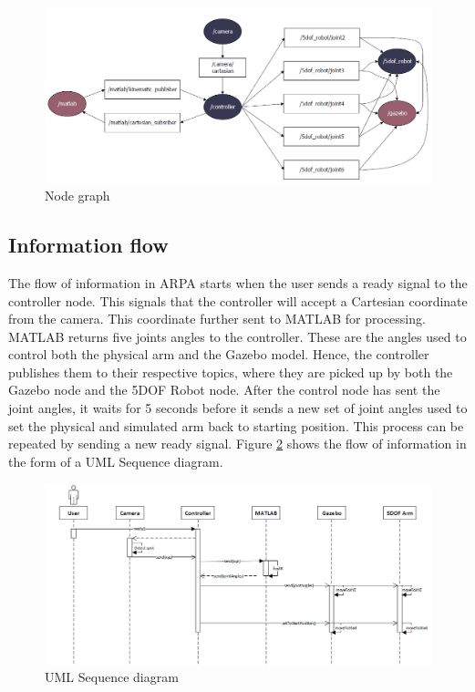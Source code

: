 \documentclass[11pt,a4paper]{report}
\begin{document}
	\begin{figure}[H]
		\includegraphics[width=\linewidth]{../Diagrams/NodeGraph-v1.png}
		\caption{Node graph}
		\label{fig:nodegraph}
	\end{figure}
	
	
	
	\subsection{Information flow}
	
	The flow of information in ARPA starts when the user sends a ready signal to the controller node. This signals that the controller will accept a Cartesian coordinate from the camera. This coordinate  further sent to MATLAB for processing. MATLAB returns five joints angles to the controller. These are the angles used to control both the physical arm and the Gazebo model. Hence, the controller publishes them to their respective topics, where they are picked up by both the Gazebo node and the 5DOF Robot node. After the control node has sent the joint angles, it waits for 5 seconds before it sends a new set of joint angles used to set the physical and simulated arm back to starting position. This process can be repeated by sending a new ready signal. Figure \ref{fig:seq-diagram} shows the flow of information in the form of a UML Sequence diagram.
	
	
	\begin{figure}[H]
		\includegraphics[width=\linewidth]{../Diagrams/SequenceDiagram-v1.png}
		\caption{UML Sequence diagram}
		\label{fig:seq-diagram}
	\end{figure}
	
\end{document}
